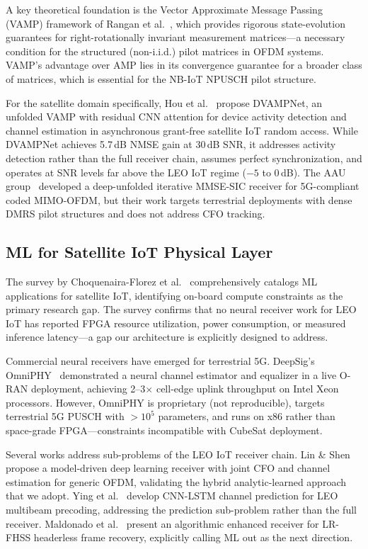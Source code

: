 \documentclass{article}
\begin{document}
A key theoretical foundation is the Vector Approximate Message Passing (VAMP) framework of Rangan et al.~\cite{rangan2017vamp,rangan2019vamp}, which provides rigorous state-evolution guarantees for right-rotationally invariant measurement matrices---a necessary condition for the structured (non-i.i.d.) pilot matrices in OFDM systems. VAMP's advantage over AMP lies in its convergence guarantee for a broader class of matrices, which is essential for the NB-IoT NPUSCH pilot structure.

For the satellite domain specifically, Hou et al.~\cite{hou2025dvampnet} propose DVAMPNet, an unfolded VAMP with residual CNN attention for device activity detection and channel estimation in asynchronous grant-free satellite IoT random access. While DVAMPNet achieves 5.7\,dB NMSE gain at 30\,dB SNR, it addresses activity detection rather than the full receiver chain, assumes perfect synchronization, and operates at SNR levels far above the LEO IoT regime ($-5$ to 0\,dB). The AAU group~\cite{dui2024} developed a deep-unfolded iterative MMSE-SIC receiver for 5G-compliant coded MIMO-OFDM, but their work targets terrestrial deployments with dense DMRS pilot structures and does not address CFO tracking.

\subsection{ML for Satellite IoT Physical Layer}

The survey by Choquenaira-Florez et al.~\cite{choquenaira2025ml} comprehensively catalogs ML applications for satellite IoT, identifying on-board compute constraints as the primary research gap. The survey confirms that no neural receiver work for LEO IoT has reported FPGA resource utilization, power consumption, or measured inference latency---a gap our architecture is explicitly designed to address.

Commercial neural receivers have emerged for terrestrial 5G. DeepSig's OmniPHY~\cite{deepsig2024} demonstrated a neural channel estimator and equalizer in a live O-RAN deployment, achieving 2--3$\times$ cell-edge uplink throughput on Intel Xeon processors. However, OmniPHY is proprietary (not reproducible), targets terrestrial 5G PUSCH with $>10^5$ parameters, and runs on x86 rather than space-grade FPGA---constraints incompatible with CubeSat deployment.

Several works address sub-problems of the LEO IoT receiver chain. Lin \& Shen~\cite{lin2024hybrid} propose a model-driven deep learning receiver with joint CFO and channel estimation for generic OFDM, validating the hybrid analytic-learned approach that we adopt. Ying et al.~\cite{ying2024cnn} develop CNN-LSTM channel prediction for LEO multibeam precoding, addressing the prediction sub-problem rather than the full receiver. Maldonado et al.~\cite{maldonado2025lrfhss} present an algorithmic enhanced receiver for LR-FHSS headerless frame recovery, explicitly calling ML out as the next direction.
\end{document}
